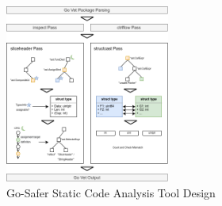\begin{figure}[!t]
    \includegraphics[width=0.48\textwidth]{gfx/figures/go-safer-architecture.png}
    \caption{Go-Safer Static Code Analysis Tool Design}
    \label{fig:safer-architecture}
\end{figure}

